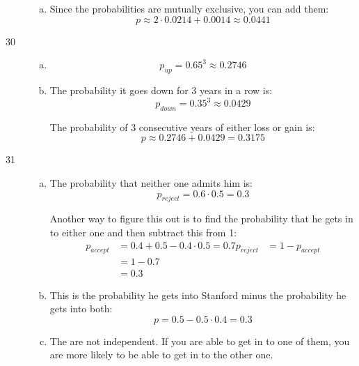 \documentclass[letterpaper, landscape]{exam}
\begin{document}
\begin{description}
\begin{enumerate}[(a)]
            \item
              Since the probabilities are mutually exclusive, you can add them:
              \[
                p \approx 2 \cdot 0.0214 + 0.0014 \approx \boxed{ 0.0441 } 
              \]
        \end{enumerate}

      \item[30]
        \begin{enumerate}[(a)]
          \item 
            \[
              p_{up} = 0.65^3 \approx \boxed{ 0.2746 }
            \]

          \item 
            The probability it goes down for 3 years in a row is:
            \[
              p_{down} = 0.35^3 \approx 0.0429
            \]

            The probability of 3 consecutive years of either loss or gain is:
            \[
              p \approx 0.2746 + 0.0429 = \boxed{ 0.3175 }
            \]

        \end{enumerate}

      \item[31]
        \begin{enumerate}[(a)]
          \item The probability that neither one admits him is:
            \[
              p_{reject} = 0.6 \cdot 0.5 = \boxed{ 0.3 }
            \]

            Another way to figure this out is to find the probability that he
            gets in to either one and then subtract this from 1:
            \begin{align*}
              p_{accept} & = 0.4 + 0.5 - 0.4 \cdot 0.5 = 0.7
              p_{reject} & = 1 - p_{accept} \\
                         & = 1 - 0.7 \\
                         & = 0.3
            \end{align*}

          \item
            This is the probability he gets into Stanford minus the probability
            he gets into both:
            \[
              p = 0.5 - 0.5 \cdot 0.4 = \boxed{ 0.3 }
            \]
            
          \item The are not independent. If you are able to get in to one of
            them, you are more likely to be able to get in to the other one.


\end{enumerate}
\end{description}
\end{document}
